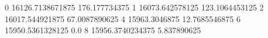 0 16126.7138671875 176.177734375
1 16073.642578125 123.1064453125
2 16017.544921875 67.0087890625
4 15963.3046875 12.7685546875
6 15950.5361328125 0.0
8 15956.3740234375 5.837890625
